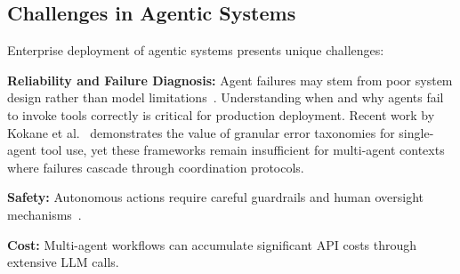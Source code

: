 
\subsection{Challenges in Agentic Systems}

Enterprise deployment of agentic systems presents unique challenges:

\textbf{Reliability and Failure Diagnosis:} Agent failures may stem from poor system design rather than model limitations~\cite{kapoor2024ai,cemri2025multifail}. Understanding when and why agents fail to invoke tools correctly is critical for production deployment. Recent work by Kokane et al.~\cite{kokane2024spectool} demonstrates the value of granular error taxonomies for single-agent tool use, yet these frameworks remain insufficient for multi-agent contexts where failures cascade through coordination protocols. 


\textbf{Safety:} Autonomous actions require careful guardrails and human oversight mechanisms~\cite{ruan2023identifying}.

\textbf{Cost:} Multi-agent workflows can accumulate significant API costs through extensive LLM calls. %

